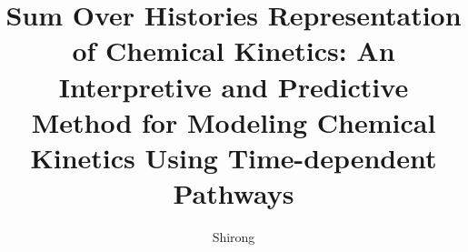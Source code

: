 \documentclass[defaultstyle,11pt]{thesis}
\title{Sum Over Histories Representation of Chemical Kinetics: An Interpretive and Predictive Method for Modeling Chemical Kinetics Using Time-dependent Pathways}
\author{Shirong}{Bai}
\begin{document}








\nocite{*}		%

\appendix

\end{document}
